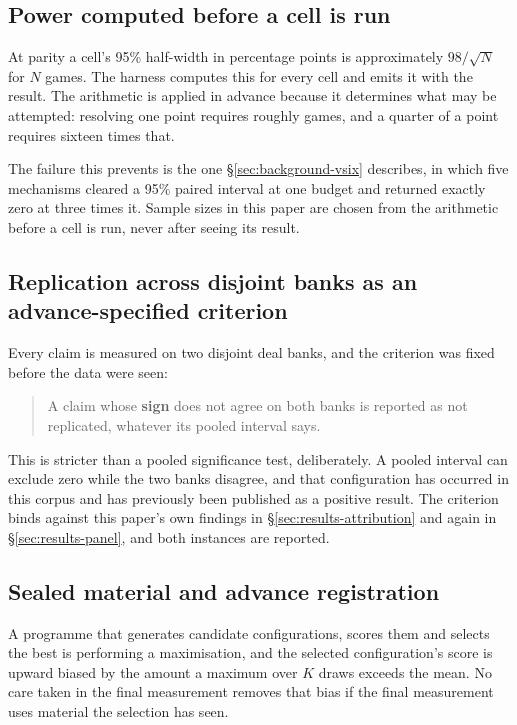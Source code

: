 \subsection{Power computed before a cell is run}
\label{sec:evaluation-power}

At parity a cell's 95\% half-width in percentage points is approximately $98/\sqrt{N}$ for $N$ games.
The harness computes this for every cell and emits it with the result. The arithmetic is applied in
advance because it determines what may be attempted: resolving one point requires roughly
\vsevenScoreboardGames{} games, and a quarter of a point requires sixteen times that.

The failure this prevents is the one \S\ref{sec:background-vsix} describes, in which five mechanisms
cleared a 95\% paired interval at one budget and returned exactly zero at three times it. Sample
sizes in this paper are chosen from the arithmetic before a cell is run, never after seeing its
result.

\subsection{Replication across disjoint banks as an advance-specified criterion}
\label{sec:evaluation-replication}

Every claim is measured on two disjoint deal banks, and the criterion was fixed before the data were
seen:

\begin{quote}
A claim whose \textbf{sign} does not agree on both banks is reported as not replicated, whatever its
pooled interval says.
\end{quote}

This is stricter than a pooled significance test, deliberately. A pooled interval can exclude zero
while the two banks disagree, and that configuration has occurred in this corpus and has previously
been published as a positive result. The criterion binds against this paper's own findings in
\S\ref{sec:results-attribution} and again in \S\ref{sec:results-panel}, and both instances are
reported.

\subsection{Sealed material and advance registration}
\label{sec:evaluation-seal}

A programme that generates candidate configurations, scores them and selects the best is performing a
maximisation, and the selected configuration's score is upward biased by the amount a maximum over
$K$ draws exceeds the mean. No care taken in the final measurement removes that bias if the final
measurement uses material the selection has seen.

